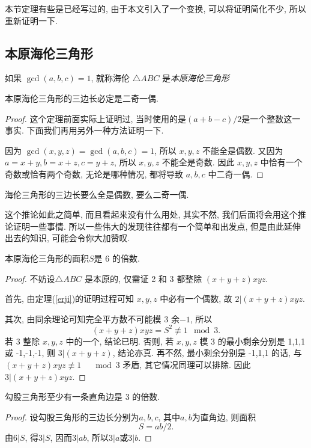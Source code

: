 \documentclass[12pt]{article}
\begin{document}
本节定理有些是已经写过的, 由于本文引入了一个变换, 可以将证明简化不少, 所以重新证明一下. 

\subsection{本原海伦三角形}
\begin{definition}
     如果 $\gcd(a,b,c)=1$, 就称海伦 $\triangle ABC$ 是\emph{本原海伦三角形}
\end{definition}

\begin{theorem}\label{erji}
    本原海伦三角形的三边长必定是二奇一偶. 
\end{theorem}
\begin{proof}
    这个定理前面实际上证明过, 当时使用的是$(a+b-c)/2$是一个整数这一事实. 下面我们再用另外一种方法证明一下. \par
    因为 $\gcd(x,y,z)=\gcd(a,b,c)=1$, 所以 $x,y,z$ 不能全是偶数. 又因为 $a=x+y,b=x+z,c=y+z$, 所以 $x,y,z$ 不能全是奇数. 因此 $x,y,z$ 中恰有一个奇数或恰有两个奇数, 无论是哪种情况, 都将导致 $a,b,c$ 中二奇一偶. 
\end{proof}

\begin{corollary}
    海伦三角形的三边长要么全是偶数, 要么二奇一偶. 
\end{corollary}

这个推论如此之简单, 而且看起来没有什么用处, 其实不然, 我们后面将会用这个推论证明一些事情. 所以一些伟大的发现往往都有一个简单和出发点, 但是由此延伸出去的知识, 可能会令你大加赞叹. 
    
\begin{theorem}\label{mianji6}
    本原海伦三角形的面积$S$是 6 的倍数. 
\end{theorem}
\begin{proof}
     不妨设$\triangle ABC$ 是本原的, 仅需证 2 和 3 都整除 $(x+y+z)xyz$. \par
     首先, 由定理(\ref{erji})的证明过程可知 $x,y,z$ 中必有一个偶数, 故 $2|(x+y+z)xyz$. \par
     其次, 由同余理论可知完全平方数不可能模 3 余$-1$, 所以
     \[(x+y+z)xyz=S^2\not\equiv1\mod3. \]
     若 3 整除 $x,y,z$ 中的一个, 结论已明. 否则, 若 $x,y,z$ 模 3 的最小剩余分别是 1,1,1 或 -1,-1,-1, 则 $3|(x+y+z)$, 结论亦真. 再不然, 最小剩余分别是 -1,1,1 的话, 与 $(x+y+z)xyz\not\equiv1\quad\mod3$ 矛盾, 其它情况同理可以排除. 因此 $3|(x+y+z)xyz$.
\end{proof}

\begin{corollary}\label{gougu3}
    勾股三角形至少有一条直角边是 3 的倍数. 
\end{corollary}
\begin{proof}
    设勾股三角形的三边长分别为$a,b,c$, 其中$a,b$为直角边, 则面积
    \[S=ab/2.\]
    由$6|S$, 得$3|S$, 因而$3|ab$, 所以$3|a$或$3|b$.
\end{proof}
\end{document}

